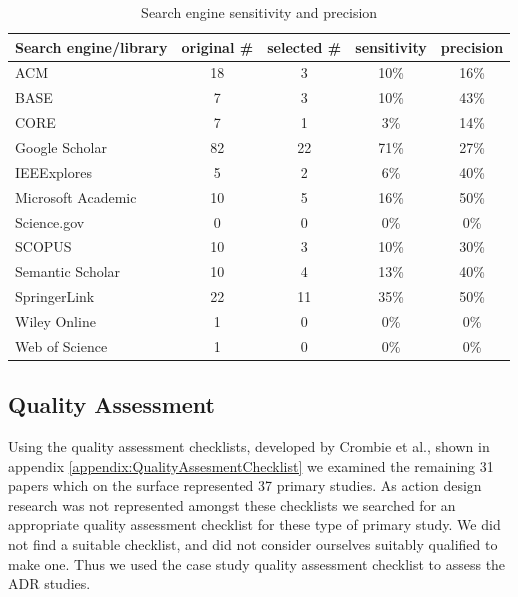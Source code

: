\begin{table}[h]
    \begin{center}
        \begin{tabular}{ | l | c | c | c | c |} 
            \hline
            Search engine/library     & original \# & selected \# & sensitivity & precision\\
            \hline
            \hline
            ACM                        & 18          & 3           & 10\%        &  16\%    \\
            BASE                       & 7           & 3           & 10\%        &  43\%    \\
            CORE                       & 7           & 1           &  3\%        &  14\%    \\
            Google Scholar             & 82          & 22          & 71\%        &  27\%    \\
            IEEExplores                & 5           & 2           &  6\%        &  40\%    \\
            Microsoft Academic         & 10          & 5           & 16\%        &  50\%    \\
            Science.gov                & 0           & 0           &  0\%        &   0\%    \\
            SCOPUS                     & 10          & 3           & 10\%        &  30\%    \\
            Semantic Scholar           & 10          & 4           & 13\%        &  40\%    \\
            SpringerLink               & 22          & 11          & 35\%        &  50\%    \\
            Wiley Online               & 1           & 0           &  0\%        &   0\%    \\
            Web of Science             & 1           & 0           &  0\%        &   0\%    \\
            \hline
        \end{tabular}
    \end{center}
    \caption{Search engine sensitivity and precision}
    \label{table:sensitivity_precision}
\end{table}


\subsection{Quality Assessment}
Using the quality assessment checklists, developed by Crombie et al.\cite{crombie1997pocket}, shown in appendix \ref{appendix:QualityAssesmentChecklist} we examined the remaining 31 papers which on the surface represented 37 primary studies.
As action design research was not represented amongst these checklists we searched for an appropriate quality assessment checklist for these type of primary study.
We did not find a suitable checklist, and did not consider ourselves suitably qualified to make one.
Thus we used the case study quality assessment checklist to assess the ADR studies.

